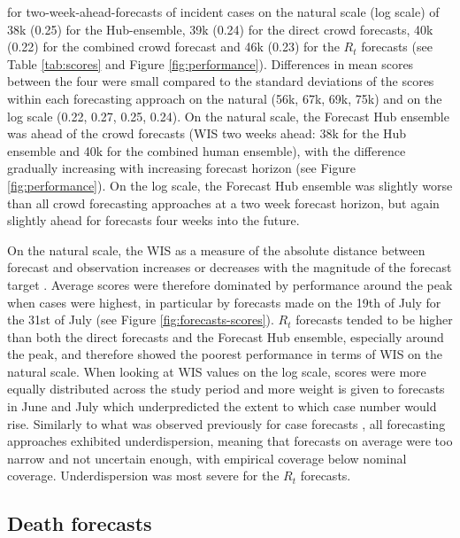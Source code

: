 \documentclass[10pt,a4paper,twocolumn]{article}
\begin{document}
for two-week-ahead-forecasts of incident cases on the natural scale (log scale) of 38k (0.25) for the Hub-ensemble, 39k (0.24) for the direct crowd forecasts, 40k (0.22) for the combined crowd forecast and 46k (0.23) for the $R_t$ forecasts (see Table \ref{tab:scores} and Figure \ref{fig:performance}). Differences in mean scores between the four were small compared to the standard deviations of the scores within each forecasting approach on the natural (56k, 67k, 69k, 75k) and on the log scale (0.22, 0.27, 0.25, 0.24). 
On the natural scale, the Forecast Hub ensemble was ahead of the crowd forecasts (WIS two weeks ahead: 38k for the Hub ensemble and 40k for the combined human ensemble), with the difference gradually increasing with increasing forecast horizon (see Figure \ref{fig:performance}). On the log scale, the Forecast Hub ensemble was slightly worse than all crowd forecasting approaches at a two week forecast horizon, but again slightly ahead for forecasts four weeks into the future. 

On the natural scale, the WIS as a measure of the absolute distance between forecast and observation increases or decreases with the magnitude of the forecast target \cite{bosseTransformationForecastsEvaluating2023, bracherEvaluatingEpidemicForecasts2021}. Average scores were therefore dominated by performance around the peak when cases were highest, in particular by forecasts made on the 19th of July for the 31st of July (see Figure \ref{fig:forecasts-scores}). $R_t$ forecasts tended to be higher than both the direct forecasts and the Forecast Hub ensemble, especially around the peak, and therefore showed the poorest performance in terms of WIS on the natural scale. When looking at WIS values on the log scale,
scores were more equally distributed across the study period and more weight is given to forecasts in June and July which underpredicted the extent to which case number would rise. Similarly to what was observed previously for case forecasts \citep{bosseComparingHumanModelbased2022, sherrattPredictivePerformanceMultimodel2022a}, all forecasting approaches exhibited underdispersion, meaning that forecasts on average were too narrow and not uncertain enough, with empirical coverage below nominal coverage. Underdispersion was most severe for the $R_t$ forecasts. 

\subsection*{Death forecasts} 
\end{document}
